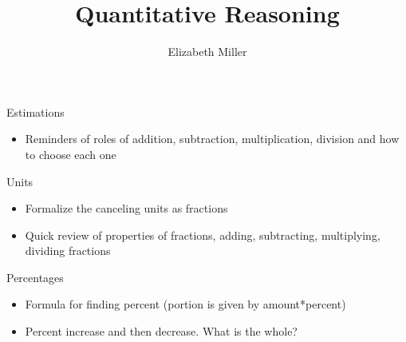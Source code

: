 \documentclass{ximera}
\author{Elizabeth Miller}
\title{Quantitative Reasoning}
\begin{document}
\begin{abstract}
\end{abstract}
\maketitle


\begin{objectives}

\item Estimations
\begin{itemize}
	\item Reminders of roles of addition, subtraction, multiplication, division and how to choose each one
\end{itemize}

\item Units 
\begin{itemize}
	\item Formalize the canceling units as fractions
	\item Quick review of properties of fractions, adding, subtracting, multiplying, dividing fractions
\end{itemize}

\item Percentages
\begin{itemize}
	\item Formula for finding percent (portion is given by amount*percent)
	\item Percent increase and then decrease. What is the whole?
\end{itemize}

\end{objectives}
\end{document}
